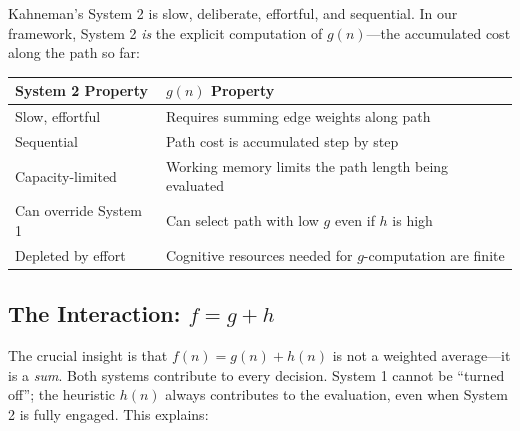 \documentclass[12pt]{article}
\theoremstyle{definition}
\theoremstyle{remark}
\begin{document}
Kahneman's System 2 is slow, deliberate, effortful, and sequential.  In our framework, System 2 \emph{is} the explicit computation of $g(n)$---the accumulated cost along the path so far:

\begin{center}
\begin{tabular}{ll}
\toprule
\textbf{System 2 Property} & \textbf{$g(n)$ Property} \\
\midrule
Slow, effortful & Requires summing edge weights along path \\
Sequential & Path cost is accumulated step by step \\
Capacity-limited & Working memory limits the path length being evaluated \\
Can override System 1 & Can select path with low $g$ even if $h$ is high \\
Depleted by effort & Cognitive resources needed for $g$-computation are finite \\
\bottomrule
\end{tabular}
\end{center}

\subsection{The Interaction: $f = g + h$}

The crucial insight is that $f(n) = g(n) + h(n)$ is not a weighted average---it is a \emph{sum}.  Both systems contribute to every decision.  System 1 cannot be ``turned off''; the heuristic $h(n)$ always contributes to the evaluation, even when System 2 is fully engaged.  This explains:
\end{document}
